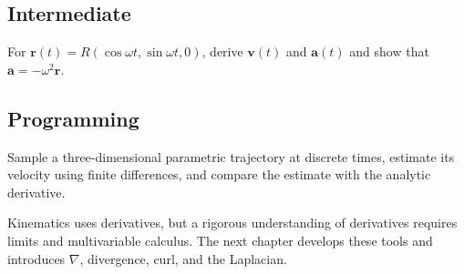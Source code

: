 \subsection*{Intermediate}
\begin{chapterexercise}
For $\mathbf r(t)=R(\cos\omega t,\sin\omega t,0)$, derive
$\mathbf v(t)$ and $\mathbf a(t)$ and show that
$\mathbf a=-\omega^2\mathbf r$.
\end{chapterexercise}

\subsection*{Programming}
\begin{chapterexercise}
Sample a three-dimensional parametric trajectory at discrete times, estimate
its velocity using finite differences, and compare the estimate with the
analytic derivative.
\end{chapterexercise}

\chapterlookaheadheading
\begin{lookingaheadbox}
Kinematics uses derivatives, but a rigorous understanding of derivatives
requires limits and multivariable calculus. The next chapter develops these
tools and introduces $\nabla$, divergence, curl, and the Laplacian.
\end{lookingaheadbox}
